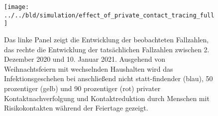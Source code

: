 \documentclass[a4paper,11pt,leqno,fleqn]{article}
\begin{document}
\begin{figure}
\label{fig:effect_of_contact_tracing_with_full_christmas}
\texttt{[image: ../../bld/simulation/effect\_of\_private\_contact\_tracing\_full]}
\caption{
    Das linke Panel zeigt die Entwicklung der beobachteten Fallzahlen, das rechte die Entwicklung der tatsächlichen Fallzahlen zwischen 2. Dezember 2020 und 10. Januar 2021. Ausgehend von Weihnachtsfeiern mit wechselnden Haushalten wird das Infektionsgeschehen bei anschließend nicht statt-findender (blau), 50 prozentiger (gelb) und 90 prozentiger (rot)
    privater Kontaktnachverfolgung und Kontaktreduktion durch Menschen mit Risikokontakten
    während der Feiertage gezeigt.
}
\end{figure}
\end{document}
